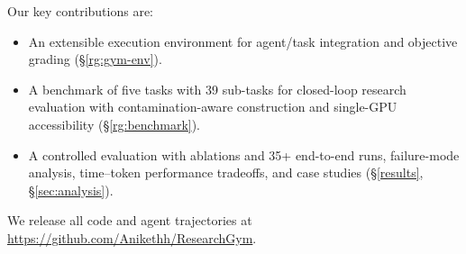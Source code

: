 \documentclass[11pt]{article}
\let\cite\citep
\newcommand{\kw}[1]{{\textsc{\MakeLowercase{#1}}}}
\theoremstyle{plain}
\theoremstyle{definition}
\theoremstyle{remark}
\begin{document}

Our key contributions are:
\begin{itemize}[noitemsep, nolistsep]
    \item An extensible execution environment for agent/task integration and objective grading (\S\ref{rg:gym-env}).
    \item A benchmark of five tasks with 39 sub-tasks for closed-loop research evaluation with contamination-aware construction and single-GPU accessibility (\S\ref{rg:benchmark}).
    \item A controlled evaluation with ablations and 35+ end-to-end runs, failure-mode analysis, time–token performance tradeoffs, and case studies (\S\ref{results}, \S\ref{sec:analysis}).
\end{itemize}

We release all code and agent trajectories at \href{https://github.com/Anikethh/ResearchGym}{https://github.com/Anikethh/ResearchGym}.
\end{document}
